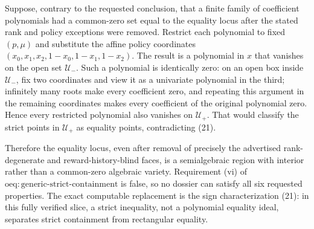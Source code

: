 Suppose, contrary to the requested conclusion, that a finite family of coefficient polynomials had a common-zero set equal to the equality locus after the stated rank and policy exceptions were removed. Restrict each polynomial to fixed \((p,\mu)\) and substitute the affine policy coordinates \((x_0,x_1,x_2,1-x_0,1-x_1,1-x_2)\). The result is a polynomial in \(x\) that vanishes on the open set \(\mathcal U_-\). Such a polynomial is identically zero: on an open box inside \(\mathcal U_-\), fix two coordinates and view it as a univariate polynomial in the third; infinitely many roots make every coefficient zero, and repeating this argument in the remaining coordinates makes every coefficient of the original polynomial zero. Hence every restricted polynomial also vanishes on \(\mathcal U_+\). That would classify the strict points in \(\mathcal U_+\) as equality points, contradicting (21).

Therefore the equality locus, even after removal of precisely the advertised rank-degenerate and reward-history-blind faces, is a semialgebraic region with interior rather than a common-zero algebraic variety. Requirement (vi) of \(\mathrm{oeq{:}generic\text{-}strict\text{-}containment}\) is false, so no dossier can satisfy all six requested properties. The exact computable replacement is the sign characterization (21): in this fully verified slice, a strict inequality, not a polynomial equality ideal, separates strict containment from rectangular equality.
